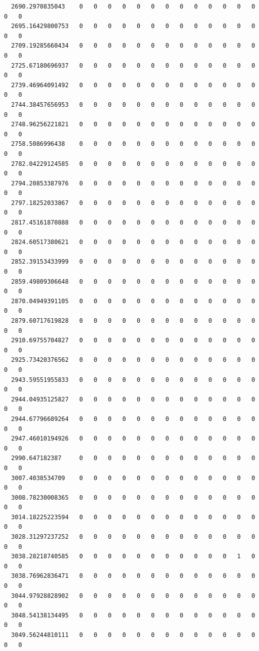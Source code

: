\documentclass[
  letterpaper,
  DIV=11,
  numbers=noendperiod]{scrartcl}
\begin{document}
\begin{verbatim}
  2690.2970835043    0   0   0   0   0   0   0   0   0   0   0   0   0   0   0
  2695.16429800753   0   0   0   0   0   0   0   0   0   0   0   0   0   0   0
  2709.19285660434   0   0   0   0   0   0   0   0   0   0   0   0   0   0   0
  2725.67180696937   0   0   0   0   0   0   0   0   0   0   0   0   0   0   0
  2739.46964091492   0   0   0   0   0   0   0   0   0   0   0   0   0   0   0
  2744.38457656953   0   0   0   0   0   0   0   0   0   0   0   0   0   0   0
  2748.96256221821   0   0   0   0   0   0   0   0   0   0   0   0   0   0   0
  2758.5086996438    0   0   0   0   0   0   0   0   0   0   0   0   0   0   0
  2782.04229124585   0   0   0   0   0   0   0   0   0   0   0   0   0   0   0
  2794.20853387976   0   0   0   0   0   0   0   0   0   0   0   0   0   0   0
  2797.18252033867   0   0   0   0   0   0   0   0   0   0   0   0   0   0   0
  2817.45161870888   0   0   0   0   0   0   0   0   0   0   0   0   0   0   0
  2824.60517380621   0   0   0   0   0   0   0   0   0   0   0   0   0   0   0
  2852.39153433999   0   0   0   0   0   0   0   0   0   0   0   0   0   0   0
  2859.49809306648   0   0   0   0   0   0   0   0   0   0   0   0   0   0   0
  2870.04949391105   0   0   0   0   0   0   0   0   0   0   0   0   0   0   0
  2879.60717619828   0   0   0   0   0   0   0   0   0   0   0   0   0   0   0
  2910.69755704827   0   0   0   0   0   0   0   0   0   0   0   0   0   0   0
  2925.73420376562   0   0   0   0   0   0   0   0   0   0   0   0   0   0   0
  2943.59551955833   0   0   0   0   0   0   0   0   0   0   0   0   0   0   0
  2944.04935125827   0   0   0   0   0   0   0   0   0   0   0   0   0   0   0
  2944.67796689264   0   0   0   0   0   0   0   0   0   0   0   0   0   0   0
  2947.46010194926   0   0   0   0   0   0   0   0   0   0   0   0   0   0   0
  2990.647182387     0   0   0   0   0   0   0   0   0   0   0   0   0   0   0
  3007.4038534709    0   0   0   0   0   0   0   0   0   0   0   0   0   0   0
  3008.78230008365   0   0   0   0   0   0   0   0   0   0   0   0   0   0   0
  3014.18225223594   0   0   0   0   0   0   0   0   0   0   0   0   0   0   0
  3028.31297237252   0   0   0   0   0   0   0   0   0   0   0   0   0   0   0
  3038.28218740585   0   0   0   0   0   0   0   0   0   0   0   1   0   0   0
  3038.76962836471   0   0   0   0   0   0   0   0   0   0   0   0   0   0   0
  3044.97928828902   0   0   0   0   0   0   0   0   0   0   0   0   0   0   0
  3048.54138134495   0   0   0   0   0   0   0   0   0   0   0   0   0   0   0
  3049.56244810111   0   0   0   0   0   0   0   0   0   0   0   0   0   0   0

\end{verbatim}
\end{document}
